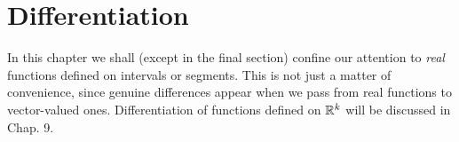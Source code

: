 \chapter{Differentiation}

In this chapter we shall (except in the final section) confine our attention to \emph{real} functions defined on intervals or segments. 
This is not just a matter of convenience, 
since genuine differences appear when we pass from real functions to vector-valued ones. 
Differentiation of functions defined on ${\protect\mathbb R}^{k}$ will be discussed in Chap. 9.



